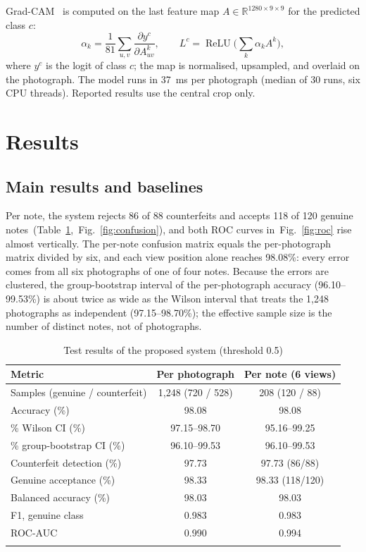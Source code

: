 \documentclass[pdflatex,iicol,sn-mathphys-num]{sn-jnl}
\begin{document}
Grad-CAM~\cite{selvaraju2017gradcam} is computed on the last feature map
$A\in\mathbb{R}^{1280\times9\times9}$ for the predicted class $c$:
\begin{equation}
\alpha_k = \frac{1}{81}\sum_{u,v}\frac{\partial y^{c}}{\partial A^{k}_{uv}},\qquad
L^{c} = \operatorname{ReLU}\!\Big(\sum_{k}\alpha_k A^{k}\Big),
\label{eq:gradcam}
\end{equation}
where $y^c$ is the logit of class $c$; the map is normalised, upsampled, and overlaid on
the photograph. The model runs in 37~ms per photograph (median of 30 runs, six CPU
threads). Reported results use the central crop only.

\section{Results}\label{sec:results}

\subsection{Main results and baselines}\label{sec:main}

Per note, the system rejects 86 of 88 counterfeits and accepts 118 of 120 genuine notes~(Table~\ref{tab:main},~Fig.~\ref{fig:confusion}), and both ROC curves in~Fig.~\ref{fig:roc} rise almost vertically. The per-note confusion matrix equals the
per-photograph matrix divided by six, and each view position alone reaches 98.08\%:
every error comes from all six photographs of one of four notes. Because the errors are
clustered, the group-bootstrap interval of the per-photograph accuracy (96.10--99.53\%)
is about twice as wide as the Wilson interval that treats the 1{,}248 photographs as
independent (97.15--98.70\%); the effective sample size is the number of distinct notes,
not of photographs.

\begin{table}[!tp]
\caption{Test results of the proposed system (threshold 0.5)}\label{tab:main}
\begin{tabular*}{\textwidth}{@{\extracolsep\fill}lcc}
\toprule
Metric & Per photograph & Per note (6 views) \\
\midrule
Samples (genuine / counterfeit) & 1{,}248 (720 / 528) & 208 (120 / 88) \\
Accuracy (\%) & 98.08 & 98.08 \\
\quad 95\% Wilson CI (\%) & 97.15--98.70 & 95.16--99.25 \\
\quad 95\% group-bootstrap CI (\%) & 96.10--99.53 & 96.10--99.53 \\
Counterfeit detection (\%) & 97.73 & 97.73 (86/88) \\
Genuine acceptance (\%) & 98.33 & 98.33 (118/120) \\
Balanced accuracy (\%) & 98.03 & 98.03 \\
F1, genuine class & 0.983 & 0.983 \\
ROC-AUC & 0.990 & 0.994 \\
\botrule
\end{tabular*}
\end{table}
\end{document}
